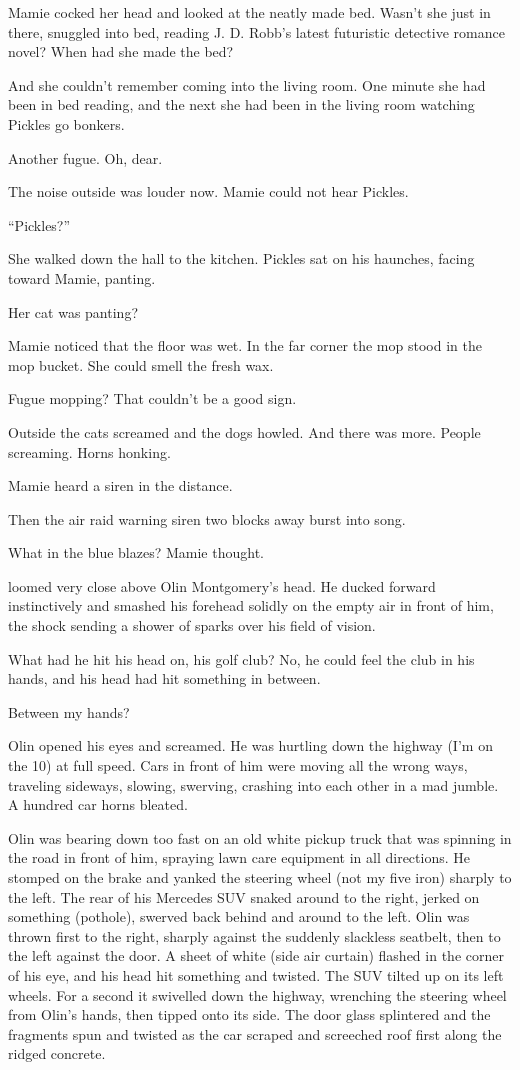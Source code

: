 Mamie cocked her head and looked at the neatly made bed. Wasn't she just in there, snuggled into bed, reading J. D. Robb's latest futuristic detective romance novel? When had she made the bed?

And she couldn't remember coming into the living room. One minute she had been in bed reading, and the next she had been in the living room watching Pickles go bonkers.

Another fugue. Oh, dear.

The noise outside was louder now. Mamie could not hear Pickles.

``Pickles?''

She walked down the hall to the kitchen. Pickles sat on his haunches, facing toward Mamie, panting.

Her cat was panting?

Mamie noticed that the floor was wet. In the far corner the mop stood in the mop bucket. She could smell the fresh wax.

Fugue mopping? That couldn't be a good sign.

Outside the cats screamed and the dogs howled. And there was more. People screaming. Horns honking.

Mamie heard a siren in the distance.

Then the air raid warning siren two blocks away burst into song.

What in the blue blazes? Mamie thought.




 loomed very close above Olin Montgomery's head. He ducked forward instinctively and smashed his forehead solidly on the empty air in front of him, the shock sending a shower of sparks over his field of vision.

What had he hit his head on, his golf club? No, he could feel the club in his hands, and his head had hit something in between.

Between my hands?

Olin opened his eyes and screamed. He was hurtling down the highway (I'm on the 10) at full speed. Cars in front of him were moving all the wrong ways, traveling sideways, slowing, swerving, crashing into each other in a mad jumble. A hundred car horns bleated.

Olin was bearing down too fast on an old white pickup truck that was spinning in the road in front of him, spraying lawn care equipment in all directions. He stomped on the brake and yanked the steering wheel (not my five iron) sharply to the left. The rear of his Mercedes SUV snaked around to the right, jerked on something (pothole), swerved back behind and around to the left. Olin was thrown first to the right, sharply against the suddenly slackless seatbelt, then to the left against the door. A sheet of white (side air curtain) flashed in the corner of his eye, and his head hit something and twisted. The SUV tilted up on its left wheels. For a second it swivelled down the highway, wrenching the steering wheel from Olin's hands, then tipped onto its side. The door glass splintered and the fragments spun and twisted as the car scraped and screeched roof first along the ridged concrete.

